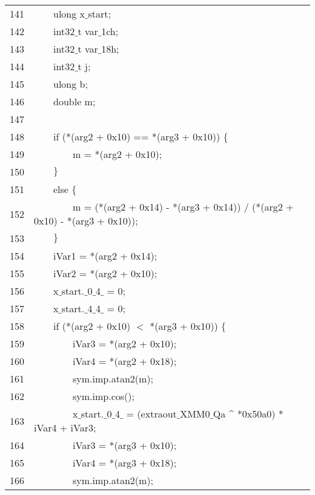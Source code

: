 \documentclass{report}
\newcommand{\tab}{$\quad$}
\newcommand{\csfont}[1]{\fontfamily{cmtt}\selectfont #1}
\begin{document}
\begin{tabular}{c|l}
  141 & {\csfont{\tab \tab ulong x$\_$start;}} \\
  142 & {\csfont{\tab \tab int32$\_$t var$\_$1ch;}} \\
  143 & {\csfont{\tab \tab int32$\_$t var$\_$18h;}} \\
  144 & {\csfont{\tab \tab int32$\_$t j;}} \\
  145 & {\csfont{\tab \tab ulong b;}} \\
  146 & {\csfont{\tab \tab double m;}} \\
  147 & {\csfont{\tab \tab }} \\
  148 & {\csfont{\tab \tab if (*(arg2 + 0x10) == *(arg3 + 0x10)) $\{$}} \\
  149 & {\csfont{\tab \tab \tab \tab m = *(arg2 + 0x10);}} \\
  150 & {\csfont{\tab \tab $\}$}} \\
  151 & {\csfont{\tab \tab else $\{$}} \\
  152 & {\csfont{\tab \tab \tab \tab m = (*(arg2 + 0x14) - *(arg3 + 0x14)) / (*(arg2 + 0x10) - *(arg3 + 0x10));}} \\
  153 & {\csfont{\tab \tab $\}$}} \\
  154 & {\csfont{\tab \tab iVar1 = *(arg2 + 0x14);}} \\
  155 & {\csfont{\tab \tab iVar2 = *(arg2 + 0x10);}} \\
  156 & {\csfont{\tab \tab x$\_$start.$\_$0$\_$4$\_$ = 0;}} \\
  157 & {\csfont{\tab \tab x$\_$start.$\_$4$\_$4$\_$ = 0;}} \\
  158 & {\csfont{\tab \tab if (*(arg2 + 0x10) $<$ *(arg3 + 0x10)) $\{$}} \\
  159 & {\csfont{\tab \tab \tab \tab iVar3 = *(arg2 + 0x10);}} \\
  160 & {\csfont{\tab \tab \tab \tab iVar4 = *(arg2 + 0x18);}} \\
  161 & {\csfont{\tab \tab \tab \tab sym.imp.atan2(m);}} \\
  162 & {\csfont{\tab \tab \tab \tab sym.imp.cos();}} \\
  163 & {\csfont{\tab \tab \tab \tab x$\_$start.$\_$0$\_$4$\_$ = (extraout$\_$XMM0$\_$Qa \string^ *0x50a0) * iVar4 + iVar3;}} \\
  164 & {\csfont{\tab \tab \tab \tab iVar3 = *(arg3 + 0x10);}} \\
  165 & {\csfont{\tab \tab \tab \tab iVar4 = *(arg3 + 0x18);}} \\
  166 & {\csfont{\tab \tab \tab \tab sym.imp.atan2(m);}} \\

\end{tabular}
\end{document}
